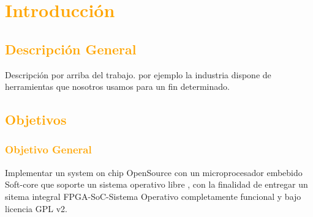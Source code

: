 \documentclass[a4paper,11pt]{article}
\begin{document}


\tableofcontents


\newpage

\section{\textcolor{orange}{Introducción}}
\subsection{\textcolor{orange}{Descripción General}}
Descripción por arriba del trabajo. por ejemplo la industria dispone de herramientas que nosotros usamos para un fin determinado.

\subsection{\textcolor{orange}{Objetivos}}
\subsubsection{\textcolor{orange}{Objetivo General}}

Implementar un system on chip OpenSource con un microprocesador embebido Soft-core que soporte un sistema operativo libre , con la finalidad de entregar un sitema integral FPGA-SoC-Sistema Operativo completamente funcional y bajo licencia GPL v2.
\end{document}
